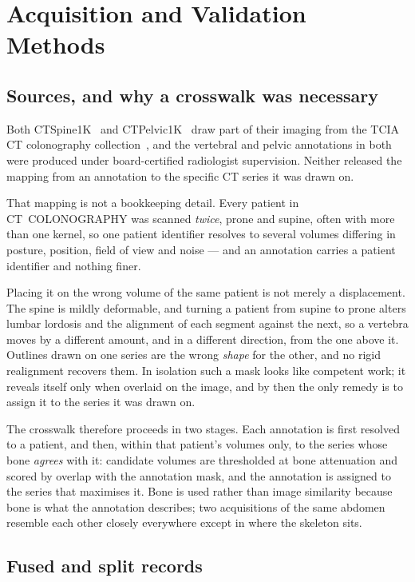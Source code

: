 \documentclass[aapm,mph,amsmath,amssymb,reprint,linenumbers]{revtex4-2}
\begin{document}
\section{Acquisition and Validation Methods}

\subsection{Sources, and why a crosswalk was necessary}

Both CTSpine1K~\cite{ctspine1k} and CTPelvic1K~\cite{ctpelvic1k} draw part of
their imaging from the TCIA CT colonography collection~\cite{colonog,tcia}, and
the vertebral and pelvic annotations in both were produced under
board-certified radiologist supervision. Neither released the mapping from an
annotation to the specific CT series it was drawn on.

That mapping is not a bookkeeping detail. Every patient in CT~COLONOGRAPHY was scanned
\emph{twice}, prone and supine, often with more than one kernel, so one patient identifier
resolves to several volumes differing in posture, position, field of view and noise --- and
an annotation carries a patient identifier and nothing finer.

Placing it on the wrong volume of the same patient is not merely a displacement. The spine is
mildly deformable, and turning a patient from supine to prone alters lumbar lordosis and the
alignment of each segment against the next, so a vertebra moves by a different amount, and in
a different direction, from the one above it. Outlines drawn on one series are the wrong
\emph{shape} for the other, and no rigid realignment recovers them. In isolation such a mask
looks like competent work; it reveals itself only when overlaid on the image, and by then the
only remedy is to assign it to the series it was drawn on.

The crosswalk therefore proceeds in two stages. Each annotation is first resolved to a
patient, and then, within that patient's volumes only, to the series whose bone
\emph{agrees} with it: candidate volumes are thresholded at bone attenuation and scored by
overlap with the annotation mask, and the annotation is assigned to the series that
maximises it. Bone is used rather than image similarity because bone is what the
annotation describes; two acquisitions of the same abdomen resemble each other closely
everywhere except in where the skeleton sits.

\subsection{Fused and split records}
\end{document}
